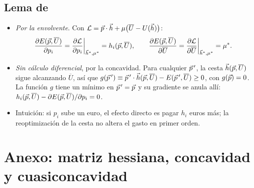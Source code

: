 \documentclass[11pt]{article}
\begin{document}
\subsection{Lema de }\label{der:shephard}

\begin{itemize}
\item \emph{Por la envolvente}. Con $\mathcal{L}=\vec{p}\cdot\vec{h}+\mu\big(\overline{U}-U(\vec{h})\big)$:
  \begin{equation*}
  \frac{\partial E(\vec{p},\overline{U})}{\partial p_i}=\frac{\partial\mathcal{L}}{\partial p_i}\bigg|_{\vec{h}^*,\mu^*}=h_i(\vec{p},\overline{U}),\qquad\frac{\partial E(\vec{p},\overline{U})}{\partial\overline{U}}=\frac{\partial\mathcal{L}}{\partial\overline{U}}\bigg|_{\vec{h}^*,\mu^*}=\mu^*.
  \end{equation*}
  \findemo
\item \emph{Sin cálculo diferencial}, por la concavidad. Para cualquier $\vec{p}\,'$, la cesta $\vec{h}(\vec{p},\overline{U})$ sigue alcanzando $\overline{U}$, así que $g(\vec{p}\,')\equiv\vec{p}\,'\cdot\vec{h}(\vec{p},\overline{U})-E(\vec{p}\,',\overline{U})\geq 0$, con $g(\vec{p})=0$. La función $g$ tiene un mínimo en $\vec{p}\,'=\vec{p}$ y su gradiente se anula allí: $h_i(\vec{p},\overline{U})-\partial E(\vec{p},\overline{U})/\partial p_i=0$\nocite{MasColellWhinstonGreen1995}.\findemo
\item Intuición: si $p_i$ sube un euro, el efecto directo es pagar $h_i$ euros más; la reoptimización de la cesta no altera el gasto en primer orden.
\end{itemize}

\section{Anexo: matriz hessiana, concavidad y cuasiconcavidad}\label{anexo:hessiana}
\end{document}
